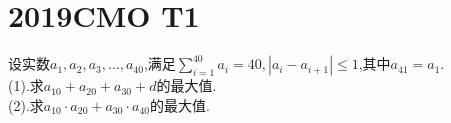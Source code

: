 \documentclass[]{article}
\title{}
\author{}
\date{}
\begin{document}
\maketitle
\section{2019CMO T1}{
设实数$a_1,a_2,a_3,…,a_{40}$,满足$\sum\limits_{i=1}^40a_i=40,\left| a_i-a_{i+1} \right|\leq 1$,其中$a_{41}=a_1$.\\
(1).求$a_{10}+a_{20}+a_{30}+d$的最大值.\\
(2).求$a_{10}·a_{20}+a_{30}·a_{40}$的最大值.
}
\end{document}

